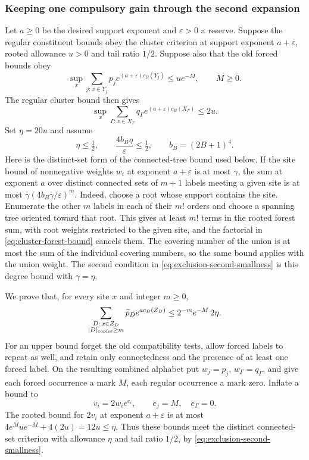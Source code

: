 \subsubsection{Keeping one compulsory gain through the second expansion}
Let $a\ge0$ be the desired support exponent and $\varepsilon>0$ a
reserve. Suppose the regular constituent bounds obey the cluster
criterion at support exponent $a+\varepsilon$, rooted allowance
$u>0$ and tail ratio $1/2$. Suppose also that the old forced bounds
obey
\[
 \sup_x\sum_{j:x\in Y_j}p_j e^{(a+\varepsilon)c_B(Y_j)}
                                                   \le u e^{-M},
                      \qquad M\ge0.
\]
The regular cluster bound then gives
\[
 \sup_x\sum_{\Gamma:x\in X_\Gamma}
                   q_\Gamma e^{(a+\varepsilon)c_B(X_\Gamma)}\le2u.
\]
Set $\eta=20u$ and assume
\begin{equation}\label{eq:exclusion-second-smallness}
       \eta\le\tfrac12,\qquad
       \frac{4b_B\eta}{\varepsilon}\le\tfrac12,
                              \qquad b_B=(2B+1)^4.
\end{equation}
Here is the distinct-set form of the connected-tree bound used
below. If the site bound of nonnegative weights $w_i$ at exponent
$a+\varepsilon$ is at most $\gamma$, the sum at exponent $a$
over distinct connected sets of $m+1$ labels meeting a given site
is at most $\gamma(4b_B\gamma/\varepsilon)^m$.
Indeed, choose a root whose support contains the site. Enumerate
the other $m$ labels in each of their $m!$ orders and choose a
spanning tree oriented toward that root. This gives at least $m!$
terms in the rooted forest sum, with root weights restricted to
the given site, and the factorial in
\eqref{eq:cluster-forest-bound} cancels them. The covering number
of the union is at most the sum of the individual covering
numbers, so the same bound applies with the union weight.
The second condition in \eqref{eq:exclusion-second-smallness}
is this degree bound with $\gamma=\eta$.

We prove that, for every site $x$ and integer $m\ge0$,
\begin{equation}\label{eq:exclusion-rooted-final}
 \sum_{\substack{D:\,x\in Z_D\\ |D|_{\rm copies}\ge m}}
              \widetilde p_D e^{a c_B(Z_D)}
                         \le 2^{-m}e^{-M}\,2\eta.
\end{equation}
For an upper bound forget the old compatibility tests, allow forced
labels to repeat as well, and retain only connectedness and the
presence of at least one forced label. On the resulting combined
alphabet put $w_j=p_j$, $w_\Gamma=q_\Gamma$, and give each forced
occurrence a mark $M$, each regular occurrence a mark zero.
Inflate a bound to
\[
             v_i=2w_i e^{e_i},\qquad e_j=M,\quad e_\Gamma=0.
\]
The rooted bound for $2v_i$ at exponent $a+\varepsilon$ is at most
$4e^Mue^{-M}+4(2u)=12u\le\eta$. Thus these bounds meet the
distinct connected-set criterion with allowance $\eta$ and tail
ratio $1/2$, by \eqref{eq:exclusion-second-smallness}.

